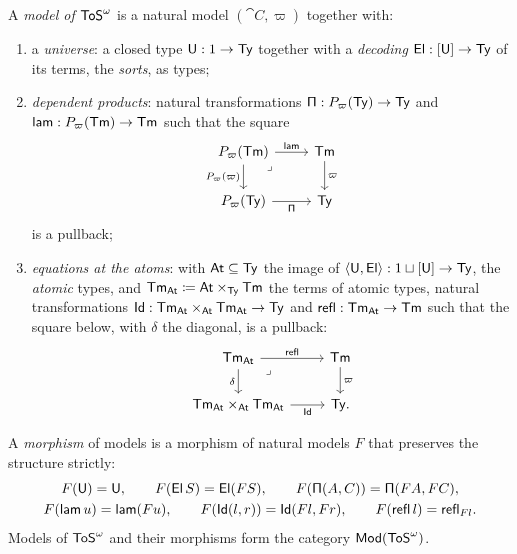 \begin{definition}\label{def:model}
    A \emph{model of $\mathsf{ToS}^\omega$} is a natural model $(\cat{C}, \varpi)$ together with:
    \begin{enumerate}
        \item a \emph{universe}: a closed type $\mathsf{U} : 1 \to \mathsf{Ty}$ together with a \emph{decoding} $\mathsf{El} : [\mathsf{U}] \to \mathsf{Ty}$ of its terms, the \emph{sorts}, as types;
        \item \emph{dependent products}: natural transformations $\mathsf{\Pi} : P_\varpi(\mathsf{Ty}) \to \mathsf{Ty}$ and $\mathsf{lam} : P_\varpi(\mathsf{Tm}) \to \mathsf{Tm}$ such that the square
        \[\begin{tikzcd}
            {P_\varpi(\Tm)} & \Tm \\
            {P_\varpi(\Ty)} & \Ty
            \arrow["\lam", from=1-1, to=1-2]
            \arrow["{P_\varpi(\varpi)}"', from=1-1, to=2-1]
            \arrow["\lrcorner"{anchor=center, pos=0.125}, draw=none, from=1-1, to=2-2]
            \arrow["\varpi", from=1-2, to=2-2]
            \arrow["\PiT"', from=2-1, to=2-2]
        \end{tikzcd}\]
        is a pullback;
        \item \emph{equations at the atoms}: with $\mathsf{At} \subseteq \mathsf{Ty}$ the image of $\langle \mathsf{U}, \mathsf{El} \rangle : 1 \sqcup [\mathsf{U}] \to \mathsf{Ty}$, the \emph{atomic} types, and $\mathsf{Tm}_{\mathsf{At}} \coloneqq \mathsf{At} \times_{\mathsf{Ty}} \mathsf{Tm}$ the terms of atomic types, natural transformations $\mathsf{Id} : \mathsf{Tm}_{\mathsf{At}} \times_{\mathsf{At}} \mathsf{Tm}_{\mathsf{At}} \to \mathsf{Ty}$ and $\mathsf{refl} : \mathsf{Tm}_{\mathsf{At}} \to \mathsf{Tm}$ such that the square below, with $\delta$ the diagonal, is a pullback:
        \[\begin{tikzcd}
            {\Tm_{\At}} & \Tm \\
            {\Tm_{\At} \times_{\At} \Tm_{\At}} & \Ty.
            \arrow["\refl", from=1-1, to=1-2]
            \arrow["\delta"', from=1-1, to=2-1]
            \arrow["\lrcorner"{anchor=center, pos=0.125}, draw=none, from=1-1, to=2-2]
            \arrow["\varpi", from=1-2, to=2-2]
            \arrow["\Id"', from=2-1, to=2-2]
        \end{tikzcd}\]
    \end{enumerate}
    A \emph{morphism} of models is a morphism of natural models $F$ that preserves the structure strictly:
    \begin{gather*}
        F(\mathsf{U}) = \mathsf{U}, \qquad F(\mathsf{El}\, S) = \mathsf{El}(FS), \qquad F(\mathsf{\Pi}(A, C)) = \mathsf{\Pi}(FA, FC),\\
        F(\mathsf{lam}\, u) = \mathsf{lam}(Fu), \qquad F(\mathsf{Id}(l, r)) = \mathsf{Id}(Fl, Fr), \qquad F(\mathsf{refl}\, l) = \mathsf{refl}_{Fl}.
    \end{gather*}
    Models of $\mathsf{ToS}^\omega$ and their morphisms form the category $\mathsf{Mod}(\mathsf{ToS}^\omega)$.
\end{definition}

